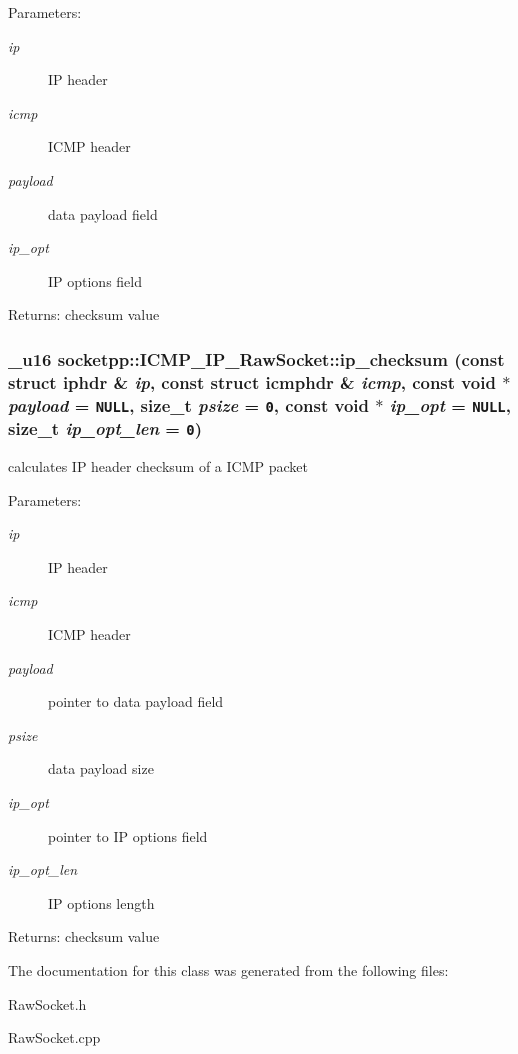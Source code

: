 \begin{Desc}
\item[Parameters:]
\begin{description}
\item[{\em ip}]IP header \item[{\em icmp}]ICMP header \item[{\em payload}]data payload field \item[{\em ip\_\-opt}]IP options field \end{description}
\end{Desc}
\begin{Desc}
\item[Returns:]checksum value \end{Desc}
\hypertarget{classsocketpp_1_1ICMP__IP__RawSocket_65eb1bc40fd501a49fee9055e22229dc}{
\subsubsection[{ip\_\-checksum}]{\setlength{\rightskip}{0pt plus 5cm}\_\-u16 socketpp::ICMP\_\-IP\_\-RawSocket::ip\_\-checksum (const struct iphdr \& {\em ip}, \/  const struct icmphdr \& {\em icmp}, \/  const void $\ast$ {\em payload} = {\tt NULL}, \/  size\_\-t {\em psize} = {\tt 0}, \/  const void $\ast$ {\em ip\_\-opt} = {\tt NULL}, \/  size\_\-t {\em ip\_\-opt\_\-len} = {\tt 0})}}
\label{classsocketpp_1_1ICMP__IP__RawSocket_65eb1bc40fd501a49fee9055e22229dc}


calculates IP header checksum of a ICMP packet 

\begin{Desc}
\item[Parameters:]
\begin{description}
\item[{\em ip}]IP header \item[{\em icmp}]ICMP header \item[{\em payload}]pointer to data payload field \item[{\em psize}]data payload size \item[{\em ip\_\-opt}]pointer to IP options field \item[{\em ip\_\-opt\_\-len}]IP options length \end{description}
\end{Desc}
\begin{Desc}
\item[Returns:]checksum value \end{Desc}


The documentation for this class was generated from the following files:\begin{CompactItemize}
\item 
RawSocket.h\item 
RawSocket.cpp\end{CompactItemize}
